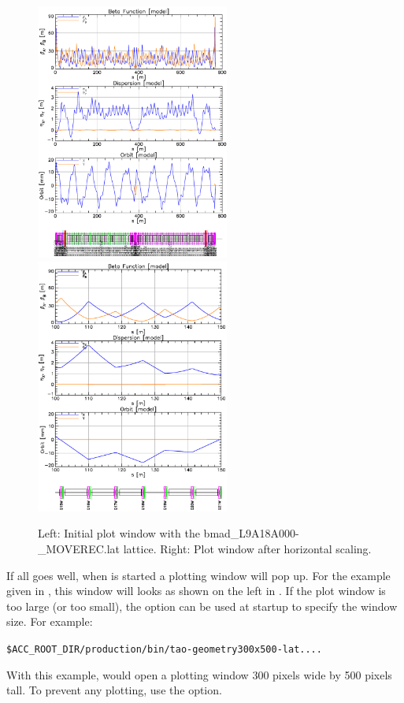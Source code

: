 \documentclass{hitec}
\newenvironment{display}
  {\vspace*{-1.5ex} \begin{alltt}}
  {\end{alltt} \vspace*{-1.0ex}}
\begin{document}
\begin{figure}[t]
\begin{centering}
\includegraphics[width=2.5in]{tao-start.pdf}
\hfil
\includegraphics[width=2.5in]{tao-x-scale.pdf}
\caption{Left: Initial \tao plot window with the bmad_L9A18A000-_MOVEREC.lat lattice.
Right: Plot window after horizontal scaling.}
\label{f:tao-start}
\end{centering}
\end{figure}

If all goes well, when \tao is started a plotting window will pop up. For the example given
in , this window will looks as shown on the left in
. If the plot window is too large (or too small), the  option
can be used at startup to specify the window size. For example:
\begin{display}
  \$ACC_ROOT_DIR/production/bin/tao -geometry 300x500 -lat ....
\end{display}
With this example, \tao would open a plotting window 300 pixels wide by 500 pixels tall.
To prevent any plotting, use the  option.
\end{document}
